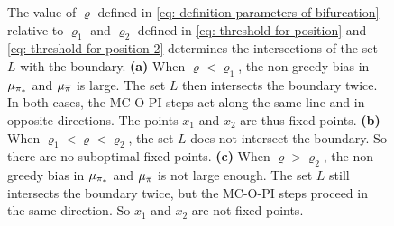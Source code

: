 \begin{figure}[p!]
    \caption{The value of $\varrho$ defined in \eqref{eq: definition parameters of bifurcation} relative to $\varrho_1$ and $\varrho_2$ defined in \eqref{eq: threshold for position} and \eqref{eq: threshold for position 2} determines the intersections of the set $L$ with the boundary.
    {\sffamily \textbf{(a)}} When $\varrho<\varrho_1$, the non-greedy bias in $\mu_{{\pi}_*}$ and $\mu_{\overline{\pi}}$ is large. The set $L$ then intersects the boundary twice. In both cases, the MC-O-PI steps act along the same line and in opposite directions. The points $x_1$ and $x_2$ are thus fixed points.
    {\sffamily \textbf{(b)}} When $\varrho_1 < \varrho < \varrho_2$, the set $L$ does not intersect the boundary. So there are no suboptimal fixed points.
    {\sffamily \textbf{(c)}} When $\varrho > \varrho_2$, the non-greedy bias in $\mu_{{\pi}_*}$ and $\mu_{\overline{\pi}}$ is not large enough. The set $L$ still intersects the boundary twice, but the MC-O-PI steps proceed in the same direction. So $x_1$ and $x_2$ are not fixed points.}

    \label{fig: explain bifurcation}

\end{figure}
